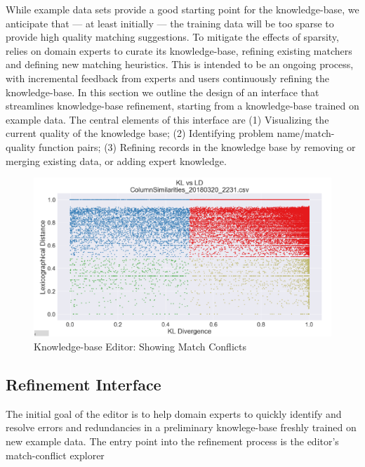 
While example data sets provide a good starting point for the \systemname knowledge-base, we anticipate that --- at least initially --- the training data will be too sparse to provide high quality matching suggestions.
To mitigate the effects of sparsity, \systemname relies on domain experts to curate its knowledge-base, refining existing matchers and defining new matching heuristics.
This is intended to be an ongoing process, with incremental feedback from experts and users continuously refining the knowledge-base.
In this section we outline the design of an interface that streamlines knowledge-base refinement, starting from a knowledge-base trained on example data.
The central elements of this interface are 
(1) Visualizing the current quality of the knowledge base;
(2) Identifying problem name/match-quality function pairs;
(3) Refining records in the knowledge base by removing or merging existing data, or adding expert knowledge.

\begin{figure}
	\centering
	\includegraphics[width=1\columnwidth]{graphics/KBUI}
	\caption{Knowledge-base Editor: Showing Match Conflicts}
	\label{fig:editor:scatterplot}
	\trimfigurespacing
\end{figure}

\subsection{Refinement Interface}
The initial goal of the \systemname editor is to help domain experts to quickly identify and resolve errors and redundancies in a preliminary knowlege-base freshly trained on new example data.  
The entry point into the refinement process is the \systemname editor's match-conflict explorer


